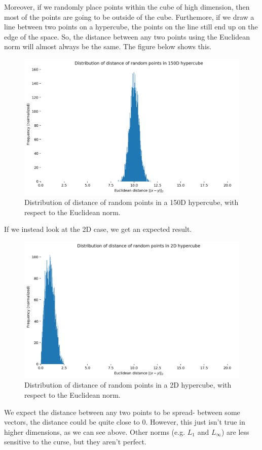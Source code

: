 \documentclass[a4paper, openany]{memoir}
\begin{document}
    Moreover, if we randomly place points within the cube of high dimension, then most of the points are going to be outside of the cube. Furthemore, if we draw a line between two points on a hypercube, the points on the line still end up on the edge of the space. So, the distance between any two points using the Euclidean norm will almost always be the same. The figure below shows this.
    \begin{figure}[H]
        \centering
        \includegraphics[scale=0.45]{src/3.8 Distribution of distance of random points 150D.png}
        \caption{Distribution of distance of random points in a 150D hypercube, with respect to the Euclidean norm.}
    \end{figure}
    If we instead look at the 2D case, we get an expected result.
    \begin{figure}[H]
        \centering
        \includegraphics[scale=0.45]{src/3.9 Distribution of distance of random points 2D.png}
        \caption{Distribution of distance of random points in a 2D hypercube, with respect to the Euclidean norm.}
    \end{figure}
    \noindent We expect the distance between any two points to be spread- between some vectors, the distance could be quite close to 0. However, this just isn't true in higher dimensions, as we can see above. Other norms (e.g. $L_1$ and $L_\infty$) are less sensitive to the curse, but they aren't perfect.
    \newpage
\end{document}
